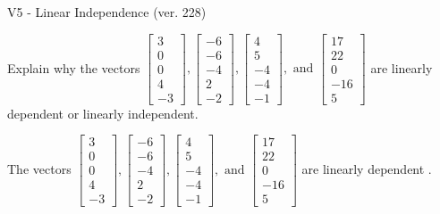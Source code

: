 \begin{exercise}
  \begin{exerciseTitle}V5 - Linear Independence (ver. 228)\end{exerciseTitle}
  \begin{exerciseStatement}
    Explain why the vectors \(\left[\begin{array}{r}
3 \\
0 \\
0 \\
4 \\
-3
\end{array}\right] , \left[\begin{array}{r}
-6 \\
-6 \\
-4 \\
2 \\
-2
\end{array}\right] , \left[\begin{array}{r}
4 \\
5 \\
-4 \\
-4 \\
-1
\end{array}\right] , \text{ and } \left[\begin{array}{r}
17 \\
22 \\
0 \\
-16 \\
5
\end{array}\right]\) are linearly dependent or linearly independent.	


  \end{exerciseStatement}
  \begin{exerciseAnswer}
   The vectors \(\left[\begin{array}{r}
3 \\
0 \\
0 \\
4 \\
-3
\end{array}\right] , \left[\begin{array}{r}
-6 \\
-6 \\
-4 \\
2 \\
-2
\end{array}\right] , \left[\begin{array}{r}
4 \\
5 \\
-4 \\
-4 \\
-1
\end{array}\right] , \text{ and } \left[\begin{array}{r}
17 \\
22 \\
0 \\
-16 \\
5
\end{array}\right]\) are 
  	 linearly dependent  .
  


  \end{exerciseAnswer}
\end{exercise}